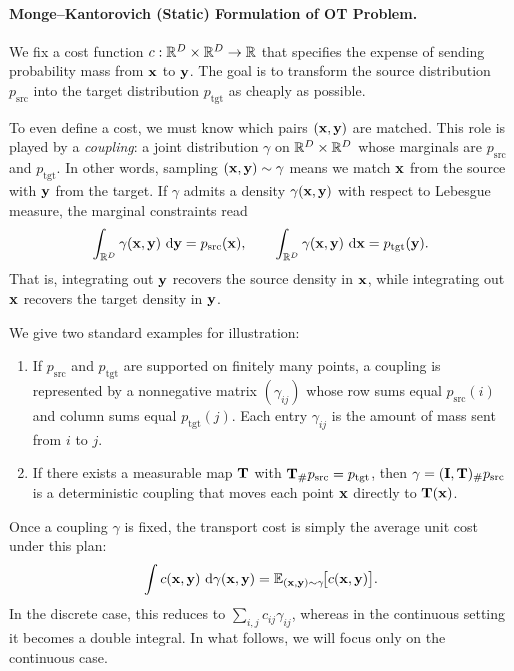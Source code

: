 \paragraph{Monge--Kantorovich (Static) Formulation of OT Problem.}
We fix a cost function $c:\mathbb{R}^D\times\mathbb{R}^D\to\mathbb{R}$ that specifies the expense of sending probability mass
from ${\mathbf{x}}$ to ${\mathbf{y}}$. The goal is to transform the source distribution $p_{\mathrm{src}}$ into the target
distribution $p_{\mathrm{tgt}}$ as cheaply as possible.

To even define a cost, we must know which pairs $({\mathbf{x}},{\mathbf{y}})$ are matched. This role is played by a
\emph{coupling}: a joint distribution $\gamma$ on $\mathbb{R}^D\times\mathbb{R}^D$ whose marginals are
$p_{\mathrm{src}}$ and $p_{\mathrm{tgt}}$. In other words, sampling $({\mathbf{x}},{\mathbf{y}})\sim\gamma$ means we match
${\mathbf{x}}$ from the source with ${\mathbf{y}}$ from the target. If $\gamma$ admits a density $\gamma({\mathbf{x}},{\mathbf{y}})$ with
respect to Lebesgue measure, the marginal constraints read
\[
\int_{\mathbb{R}^D} \gamma({\mathbf{x}},{\mathbf{y}})\,\mathop{}\!\mathrm{d} {\mathbf{y}} = p_{\mathrm{src}}({\mathbf{x}}), 
\qquad 
\int_{\mathbb{R}^D} \gamma({\mathbf{x}},{\mathbf{y}})\,\mathop{}\!\mathrm{d} {\mathbf{x}} = p_{\mathrm{tgt}}({\mathbf{y}}).
\]
That is, integrating out ${\mathbf{y}}$ recovers the source density in ${\mathbf{x}}$, while integrating out ${\mathbf{x}}$
recovers the target density in ${\mathbf{y}}$.

We give two standard examples for illustration:
\begin{enumerate}
    \item {}  
    If $p_{\mathrm{src}}$ and $p_{\mathrm{tgt}}$ are supported on finitely many points, a coupling is
    represented by a nonnegative matrix $(\gamma_{ij})$ whose row sums equal $p_{\mathrm{src}}(i)$ and
    column sums equal $p_{\mathrm{tgt}}(j)$. Each entry $\gamma_{ij}$ is the amount of mass sent from
    $i$ to $j$.
    \item {}  
    If there exists a measurable map ${\mathbf{T}}$ with ${\mathbf{T}}_\#p_{\mathrm{src}}=p_{\mathrm{tgt}}$, then
    $\gamma=({\mathbf{I}},{\mathbf{T}})_\#p_{\mathrm{src}}$ is a deterministic coupling that moves each point
    ${\mathbf{x}}$ directly to ${\mathbf{T}}({\mathbf{x}})$.
\end{enumerate}

Once a coupling $\gamma$ is fixed, the transport cost is simply the average unit cost under this plan:
\[
\int c({\mathbf{x}},{\mathbf{y}})\,\mathop{}\!\mathrm{d}\gamma({\mathbf{x}},{\mathbf{y}})
=\mathbb{E}_{({\mathbf{x}},{\mathbf{y}})\sim\gamma}\!\big[c({\mathbf{x}},{\mathbf{y}})\big].
\]
In the discrete case, this reduces to $\sum_{i,j} c_{ij}\gamma_{ij}$, whereas in
the continuous setting it becomes a double integral. In what follows, we will
focus only on the continuous case.

